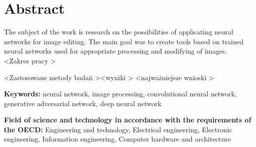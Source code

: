 \section*{Abstract}
  The subject of the work is research on the possibilities of applicating
  neural networks for image editing. The main goal was to create tools based on
  trained neural networks used for appropriate processing and modifying of
  images. \textless Zakres pracy \textgreater

  \textless Zastosowane metody badań \textgreater \textless wyniki \textgreater
  \textless najważniejsze wnioski \textgreater

  \bigskip

  \noindent\textbf{Keywords:} neural network, image processing, convolutional
  neural network, generative adversarial network, deep neural network

  \bigskip

  \noindent\textbf{Field of science and technology in accordance with the
  requirements of the OECD:} Engineering and technology, Electrical engineering,
  Electronic engineering, Information engineering, Computer hardware and
  architecture
